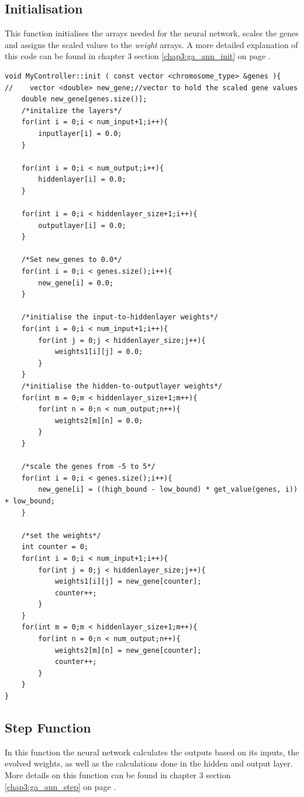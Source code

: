 \subsection{Initialisation}
\label{code:ga_ann_init}
This function initialises the arrays needed for the neural network,  scales the genes and assigns the scaled values to the \textit{weight} arrays. A more detailed explanation of this code can be found in chapter 3 section \ref{chap3:ga_ann_init} on page \pageref{chap3:ga_ann_init}.
\begin{lstlisting}[caption = {GA Assisted Artificial Neural Network Initialisation}]
void MyController::init ( const vector <chromosome_type> &genes ){
//    vector <double> new_gene;//vector to hold the scaled gene values
    double new_gene[genes.size()];
    /*initalize the layers*/
    for(int i = 0;i < num_input+1;i++){
        inputlayer[i] = 0.0;
    }

    for(int i = 0;i < num_output;i++){
        hiddenlayer[i] = 0.0;
    }

    for(int i = 0;i < hiddenlayer_size+1;i++){
        outputlayer[i] = 0.0;
    }

    /*Set new_genes to 0.0*/
    for(int i = 0;i < genes.size();i++){
        new_gene[i] = 0.0;
    }

    /*initialise the input-to-hiddenlayer weights*/
    for(int i = 0;i < num_input+1;i++){
        for(int j = 0;j < hiddenlayer_size;j++){
            weights1[i][j] = 0.0;
        }
    }
    /*initialise the hidden-to-outputlayer weights*/
    for(int m = 0;m < hiddenlayer_size+1;m++){
        for(int n = 0;n < num_output;n++){
            weights2[m][n] = 0.0;
        }
    }

    /*scale the genes from -5 to 5*/
    for(int i = 0;i < genes.size();i++){
        new_gene[i] = ((high_bound - low_bound) * get_value(genes, i)) + low_bound;
    }

    /*set the weights*/
    int counter = 0;
    for(int i = 0;i < num_input+1;i++){
        for(int j = 0;j < hiddenlayer_size;j++){
            weights1[i][j] = new_gene[counter];
            counter++;
        }
    }
    for(int m = 0;m < hiddenlayer_size+1;m++){
        for(int n = 0;n < num_output;n++){
            weights2[m][n] = new_gene[counter];
            counter++;
        }
    }
}
\end{lstlisting}

\subsection{Step Function}
\label{code:ga_ann_step}
In this function the neural network calculates the outputs based on its inputs, the evolved weights, as well as the calculations done in the hidden and output layer.
More details on this function can be found in chapter 3 section \ref{chap3:ga_ann_step} on page \pageref{chap3:ga_ann_step}.

